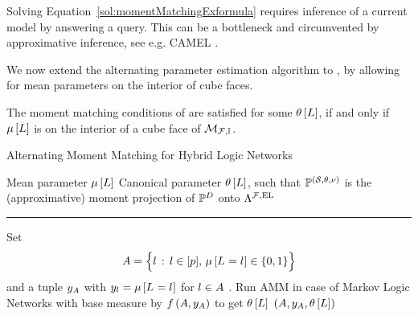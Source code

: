 Solving Equation~\ref{sol:momentMatchingExformula} requires inference of a current model by answering a query.
This can be a bottleneck and circumvented by approximative inference, see e.g. CAMEL \cite{ganapathi_constrained_2008}.

\subsubsect{\HybridLogicNetworks{}}

We now extend the alternating parameter estimation algorithm to \HybridLogicNetworks{}, by allowing for mean parameters on the interior of cube faces.

The moment matching conditions of  are satisfied for some $\theta\left[L\right]$, if and only if $\mu\left[L\right]$ is on the interior of a cube face of $\mathcal{M}_{\mathcal{F},\mathbb{I}}$.

\begin{algorithm}[hbt!]
    \caption{Alternating Moment Matching for Hybrid Logic Networks}
    \begin{algorithmic}
        \Require Mean parameter $\mu\left[L\right]$ %
        \Ensure Canonical parameter $\theta\left[L\right]$, such that $\mathbb{P}^{(\mathcal{S},\theta,\nu)}$ is the (approximative) moment projection of $\mathbb{P}^{D}$ onto $\Lambda^{\mathcal{F},\mathrm{EL}}$
        \hrule
        \State Set
        \[ A = \Big\{ l \,:\, l\in[p] ,\, \mu\left[L_{}=l_{}\right]\in\{0,1\} \Big\}\]
        and a tuple $y_{A}$ with $y_{l}=\mu\left[L_{}=l_{}\right]$ for $l\in A$ .
        \State Run AMM in case of Markov Logic Networks with base measure by $f\left(A,y_{A}\right)$ to get $\theta\left[L\right]$
        \State \Return $(A,y_{A},\theta\left[L\right])$
    \end{algorithmic}
\end{algorithm}



